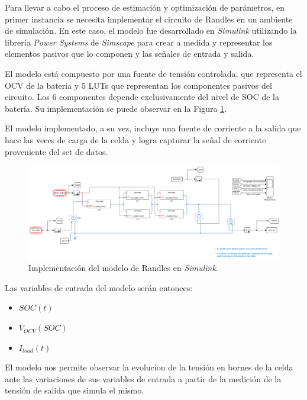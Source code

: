 \documentclass[10pt,a4paper]{article}
\begin{document}
Para llevar a cabo el proceso de estimación y optimizaci\'on de par\'ametros, en
primer instancia se necesita implementar el circuito de Randles en un ambiente
de simulaci\'on. En este caso, el modelo fue desarrollado en \emph{Simulink}
utilizando la librer\'ia \emph{Power Systems} de \emph{Simscape} para crear a
medida y representar los elementos pasivos que lo componen y las señales de
entrada y salida.

El modelo est\'a compuesto por una fuente de tensi\'on controlada, que
representa el \acrshort{OCV} de la bater\'ia y 5 \acrshort{LUT}s que
representan los componentes pasivos del circuito. Los 6 componentes depende
exclusivamente del nivel de \acrshort{SOC} de la bater\'ia. Su implementaci\'on
se puede observar en la Figura \ref{battery_model_simulink}. 

El modelo implementado, a su vez, incluye una fuente de corriente a la salida
que hace las veces de carga de la celda y logra capturar la señal de corriente
proveniente del set de datos.

\begin{figure}[h!]
    \begin{center}
        \includegraphics[width=.9\textwidth]{battery_model_simulink.png}
        \caption{Implementaci\'on del modelo de Randles en \emph{Simulink}.}
        \label{battery_model_simulink}
    \end{center}
\end{figure}
\FloatBarrier

Las variables de entrada del modelo serán entonces: 

\begin{itemize}
    \item $SOC(t)$
    \item $V_{OCV}(SOC)$
    \item $I_{load}(t)$
\end{itemize}

El modelo nos permite observar la evolucíon de la tensión en bornes de la celda
ante las variaciones de sus variables de entrada a partir de la medición de la
tensi\'on de salida que simula el mismo.
\end{document}
